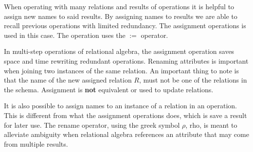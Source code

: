 \documentclass{report}
\begin{document}
        When operating with many relations and results of operations it is helpful to assign new names to said results. By assigning names to results we are able to recall previous operations with limited redundancy. The assignment operations is used in this case. The operation uses the $:=$ operator.


        In multi-step operations of relational algebra, the assignment operation saves space and time rewriting redundant operations. Renaming attributes is important when joining two instances of the same relation. An important thing to note is that the name of the new assigned relation $R$, must not be one of the relations in the schema. Assignment is \textbf{not} equivalent or used to update relations. \vspace{.5cm}
         
         \par It is also possible to assign names to an instance of a relation in an operation. This is different from what the assignment operations does, which is save a result for later use. The rename operator, using the greek symbol $\rho$, rho, is meant to alleviate ambiguity when relational algebra references an attribute that may come from multiple results. 
\vspace{.5cm}
 
\end{document}
